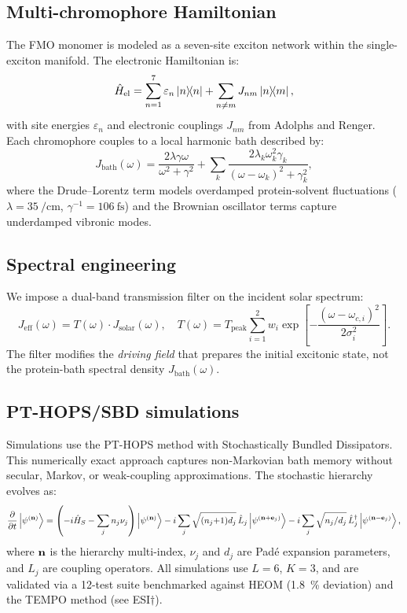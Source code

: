 \documentclass[11pt,a4paper]{article}
\begin{document}
\subsection{Multi-chromophore Hamiltonian}
The FMO monomer is modeled as a seven-site exciton network within the single-exciton manifold. The electronic Hamiltonian is:
\begin{equation}
\hat{H}_{\mathrm{el}} = \sum_{n=1}^{7} \varepsilon_n \dyad{n} + \sum_{n \neq m} J_{nm} \dyad{n}{m},
\end{equation}
with site energies $\varepsilon_n$ and electronic couplings $J_{nm}$ from Adolphs and Renger.\cite{Adolphs2006} Each chromophore couples to a local harmonic bath described by:\cite{Moix2011}
\begin{equation}
J_{\mathrm{bath}}(\omega) = \frac{2\lambda\gamma\omega}{\omega^2 + \gamma^2} + \sum_k \frac{2\lambda_k\omega_k^2\gamma_k}{(\omega-\omega_k)^2 + \gamma_k^2},
\label{eq:spectral_density}
\end{equation}
where the Drude--Lorentz term models overdamped protein-solvent fluctuations ($\lambda = \SI{35}{\per\centi\meter}$, $\gamma^{-1} = \SI{106}{\femto\second}$) and the Brownian oscillator terms capture underdamped vibronic modes.\cite{Chin2013}

\subsection{Spectral engineering}
We impose a dual-band transmission filter on the incident solar spectrum:
\begin{equation}
J_{\mathrm{eff}}(\omega) = T(\omega) \cdot J_{\mathrm{solar}}(\omega), \quad T(\omega) = T_{\mathrm{peak}} \sum_{i=1}^{2} w_i \exp\!\left[-\frac{(\omega - \omega_{c,i})^2}{2\sigma_i^2}\right].
\label{eq:filtered_spectral_density}
\end{equation}
The filter modifies the \textit{driving field} that prepares the initial excitonic state, not the protein-bath spectral density $J_{\mathrm{bath}}(\omega)$.

\subsection{PT-HOPS/SBD simulations}
Simulations use the PT-HOPS method with Stochastically Bundled Dissipators.\cite{Suess2014,Citty2024a} This numerically exact approach captures non-Markovian bath memory without secular, Markov, or weak-coupling approximations. The stochastic hierarchy evolves as:
\begin{equation}
\pdv{t}\ket{\psi^{(\vb{n})}} = \left(-i\hat{H}_S - \sum_j n_j\nu_j\right)\ket{\psi^{(\vb{n})}}
- i\sum_j \sqrt{(n_j{+}1)d_j}\,\hat{L}_j\ket{\psi^{(\vb{n}+\vb{e}_j)}}
- i\sum_j \sqrt{n_j/d_j}\,\hat{L}_j^\dagger\ket{\psi^{(\vb{n}-\vb{e}_j)}},
\end{equation}
where $\vb{n}$ is the hierarchy multi-index, $\nu_j$ and $d_j$ are Padé expansion parameters, and $\hat{L}_j$ are coupling operators.\cite{Duan2017} All simulations use $L = 6$, $K = 3$, and are validated via a 12-test suite benchmarked against HEOM\cite{Ishizaki2009a} (\SI{1.8}{\percent} deviation) and the TEMPO method\cite{Strathearn2018} (see ESI$\dagger$).
\end{document}
